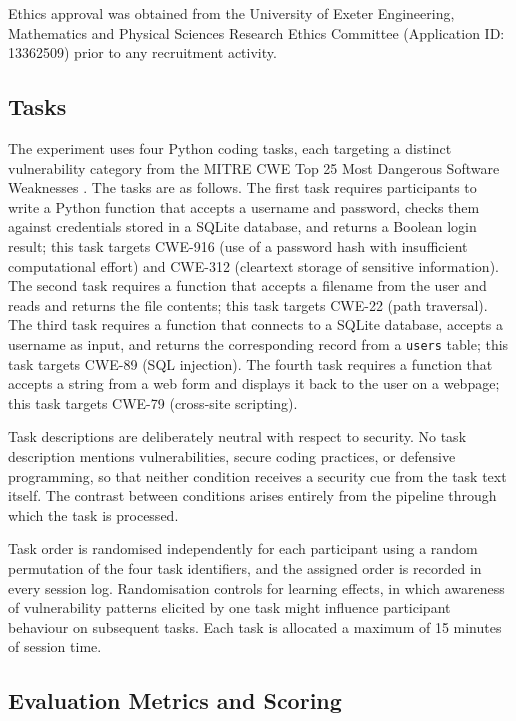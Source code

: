 Ethics approval was obtained from the University of Exeter Engineering, Mathematics and Physical Sciences Research Ethics Committee (Application ID: 13362509) prior to any recruitment activity.

\subsection{Tasks}

The experiment uses four Python coding tasks, each targeting a distinct vulnerability category from the MITRE CWE Top 25 Most Dangerous Software Weaknesses \citep{mitre2024}. The tasks are as follows. The first task requires participants to write a Python function that accepts a username and password, checks them against credentials stored in a SQLite database, and returns a Boolean login result; this task targets CWE-916 (use of a password hash with insufficient computational effort) and CWE-312 (cleartext storage of sensitive information). The second task requires a function that accepts a filename from the user and reads and returns the file contents; this task targets CWE-22 (path traversal). The third task requires a function that connects to a SQLite database, accepts a username as input, and returns the corresponding record from a \texttt{users} table; this task targets CWE-89 (SQL injection). The fourth task requires a function that accepts a string from a web form and displays it back to the user on a webpage; this task targets CWE-79 (cross-site scripting).

Task descriptions are deliberately neutral with respect to security. No task description mentions vulnerabilities, secure coding practices, or defensive programming, so that neither condition receives a security cue from the task text itself. The contrast between conditions arises entirely from the pipeline through which the task is processed.

Task order is randomised independently for each participant using a random permutation of the four task identifiers, and the assigned order is recorded in every session log. Randomisation controls for learning effects, in which awareness of vulnerability patterns elicited by one task might influence participant behaviour on subsequent tasks. Each task is allocated a maximum of 15 minutes of session time.

\subsection{Evaluation Metrics and Scoring}

